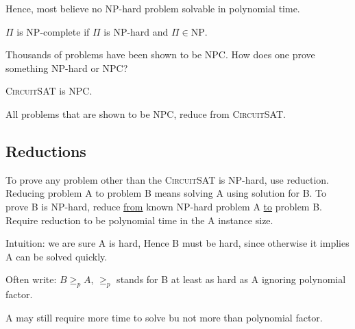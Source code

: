 Hence, most believe no NP-hard problem solvable in polynomial time.

$\Pi$ is NP-complete if $\Pi$ is NP-hard and $\Pi \in \text{NP}$.

Thousands of problems have been shown to be NPC.
How does one prove something NP-hard or NPC?

\begin{theorem} \textsc{CircuitSAT} is NPC.\end{theorem}

All problems that are shown to be NPC, reduce from \textsc{CircuitSAT}.

\subsection{Reductions}
To prove any problem other than the \textsc{CircuitSAT} is NP-hard, use reduction.
Reducing problem A to problem B means solving A using solution for B.
To prove B is NP-hard, reduce \underline{from} known NP-hard problem A \underline{to} problem B.
Require reduction to be polynomial time in the A instance size.

Intuition: we are sure A is hard, Hence B must be hard, since otherwise it implies A can be
solved quickly.

Often write: $B \geq_p A$,
$\geq_p$ stands for B at least as hard as A ignoring polynomial factor.

A may still require more time to solve bu not more than polynomial factor.
